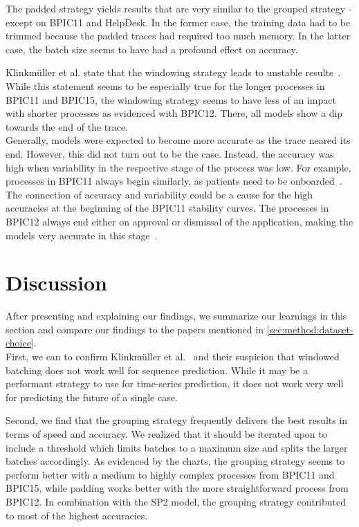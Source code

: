 The padded strategy yields results that are very similar to the grouped strategy - except on BPIC11 and HelpDesk. In the former case, the training data had to be trimmed because the padded traces had required too much memory. In the latter case, the batch size seems to have had a profound effect on accuracy.

Klinkmüller et al. state that the windowing strategy leads to unstable results~\cite{klinkmuller2018reliablemonitoring}. While this statement seems to be especially true for the longer processes in BPIC11 and BPIC15, the windowing strategy seems to have less of an impact with shorter processes as evidenced with BPIC12. There, all models show a dip towards the end of the trace.\\

Generally, models were expected to become more accurate as the trace neared its end. However, this did not turn out to be the case. Instead, the accuracy was high when variability in the respective stage of the process was low. For example, processes in BPIC11 always begin similarly, as patients need to be onboarded~\cite{bose2011analysis}. The connection of accuracy and variability could be a cause for the high accuracies at the beginning of the BPIC11 stability curves. The processes in BPIC12 always end either on approval or dismissal of the application, making the models very accurate in this stage~\cite{adriansyah2012mining}.

\section{Discussion}\label{sec:eval:discussion}
After presenting and explaining our findings, we summarize our learnings in this section and compare our findings to the papers mentioned in \autoref{sec:method:dataset-choice}.\\

First, we can to confirm Klinkmüller et al.~\cite{klinkmuller2018reliablemonitoring} and their suspicion that windowed batching does not work well for sequence prediction. While it may be a performant strategy to use for time-series prediction, it does not work very well for predicting the future of a single case.

Second, we find that the grouping strategy frequently delivers the best results in terms of speed and accuracy. We realized that it should be iterated upon to include a threshold which limits batches to a maximum size and splits the larger batches accordingly. As evidenced by the charts, the grouping strategy seems to perform better with a medium to highly complex processes from BPIC11 and BPIC15, while padding works better with the more straightforward process from BPIC12. In combination with the SP2 model, the grouping strategy contributed to most of the highest accuracies.


